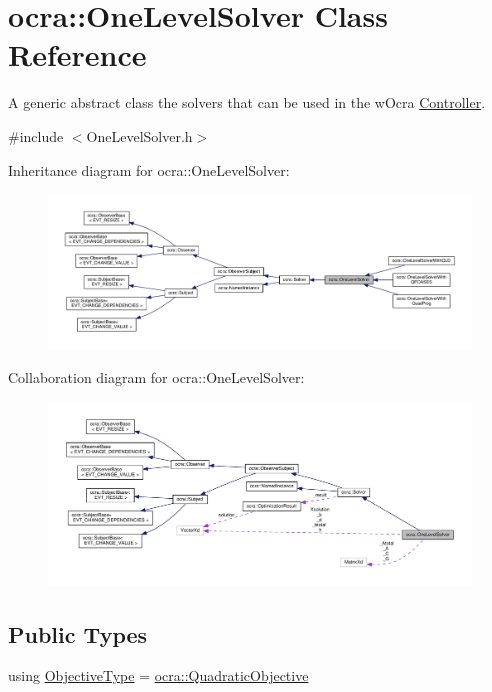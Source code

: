 \hypertarget{classocra_1_1OneLevelSolver}{}\section{ocra\+:\+:One\+Level\+Solver Class Reference}
\label{classocra_1_1OneLevelSolver}


A generic abstract class the solvers that can be used in the w\+Ocra \hyperlink{classocra_1_1Controller}{Controller}.  




{\ttfamily \#include $<$One\+Level\+Solver.\+h$>$}



Inheritance diagram for ocra\+:\+:One\+Level\+Solver\+:
\nopagebreak
\begin{figure}[H]
\begin{center}
\leavevmode
\includegraphics[width=350pt]{d2/d00/classocra_1_1OneLevelSolver__inherit__graph}
\end{center}
\end{figure}


Collaboration diagram for ocra\+:\+:One\+Level\+Solver\+:
\nopagebreak
\begin{figure}[H]
\begin{center}
\leavevmode
\includegraphics[width=350pt]{d9/d33/classocra_1_1OneLevelSolver__coll__graph}
\end{center}
\end{figure}
\subsection*{Public Types}
\begin{DoxyCompactItemize}
\item 
using \hyperlink{classocra_1_1OneLevelSolver_a93b0be052a859bbd4c81584aa1646ffb}{Objective\+Type} = \hyperlink{namespaceocra_a0b50673710f087c0f1733aefd1a8e0f7}{ocra\+::\+Quadratic\+Objective}
\end{DoxyCompactItemize}
